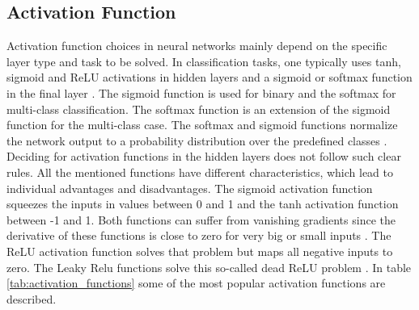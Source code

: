 \subsection{Activation Function}
Activation function choices in neural networks mainly depend on the specific layer type and task to be solved. In classification tasks, one typically uses tanh, sigmoid and ReLU activations in hidden layers and a sigmoid or softmax function in the final layer \cite{ShilohPerl2020}. The sigmoid function is used for binary and the softmax for multi-class classification. The softmax function is an extension of the sigmoid function for the multi-class case. The softmax and sigmoid functions normalize the network output to a probability distribution over the predefined classes \cite{ShilohPerl2020}. Deciding for activation functions in the hidden layers does not follow such clear rules. All the mentioned functions have different characteristics, which lead to individual advantages and disadvantages. The sigmoid activation function squeezes the inputs in values between 0 and 1 and the tanh activation function between -1 and 1. Both functions can suffer from vanishing gradients since the derivative of these functions is close to zero for very big or small inputs \cite{Calin2020}. The ReLU activation function solves that problem but maps all negative inputs to zero. The Leaky Relu functions solve this so-called dead ReLU problem  \cite{Dubey2019}. In table \ref{tab:activation_functions} some of the most popular activation functions are described.

